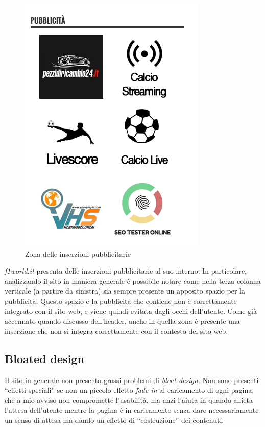 \begin{figure}[H]
  \centering
  \includegraphics[scale=0.45]{ads}
  \caption{Zona delle inserzioni pubblicitarie}
\end{figure}
\textit{f1world.it} presenta delle inserzioni pubblicitarie al suo interno.
In particolare, analizzando il sito in maniera generale è possibile notare come
nella terza colonna verticale (a partire da sinistra) sia sempre presente un
apposito spazio per la pubblicità. Questo spazio e la pubblicità che contiene
non è correttamente integrato con il sito web, e viene quindi evitata dagli
occhi dell'utente.
Come già accennato quando discusso dell'header, anche in quella zona è presente
una inserzione che non si integra correttamente con il contesto del sito web.

\subsection{Bloated design}
Il sito in generale non presenta grossi problemi di \textit{bloat design}.
Non sono presenti ``effetti speciali'' se non un piccolo effetto
\textit{fade-in} al caricamento di ogni pagina, che a mio avviso non compromette
l'usabilità, ma anzi l'aiuta in quando allieta l'attesa dell'utente mentre la
pagina è in caricamento senza dare necessariamente un senso di attesa ma dando
un effetto di ``costruzione'' dei contenuti.

